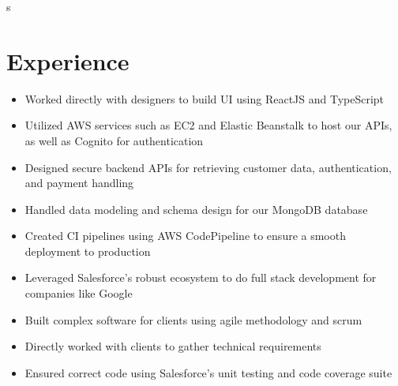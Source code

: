 s\documentclass{cv}
\begin{document}
	\section{Experience}
	\begin{itemize}
		\item Worked directly with designers to build UI using ReactJS and TypeScript
		\item Utilized AWS services such as EC2 and Elastic Beanstalk to host our APIs, as well as Cognito for authentication
		\item Designed secure backend APIs for retrieving customer data, authentication, and payment handling
		\item Handled data modeling and schema design for our MongoDB database
		\item Created CI pipelines using AWS CodePipeline to ensure a smooth deployment to production
	\end{itemize}

	\begin{itemize}
		\item Leveraged Salesforce's robust ecosystem to do full stack development for companies like Google
		\item Built complex software for clients using agile methodology and scrum
		\item Directly worked with clients to gather technical requirements
		\item Ensured correct code using Salesforce's unit testing and code coverage suite
	\end{itemize}
\end{document}
